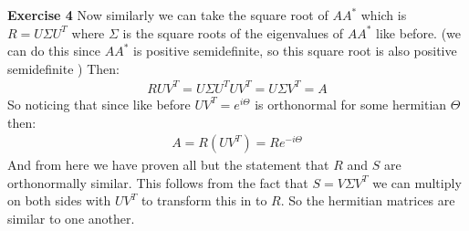 \documentclass[12pt]{article}
\newenvironment{exercise}[1]{\vspace{.1in}\noindent\textbf{Exercise #1 \hspace{.05em}}}{}
\theoremstyle{definition}
\theoremstyle{remark}
\begin{document}
\begin{exercise}{4}
	Now similarly we can take the square root of $AA^*$ which is $R=U\Sigma U^T$ where $\Sigma$ is the square roots of the eigenvalues of $AA^*$ like before. (we can do this since $AA^*$ is positive semidefinite, so this square root is also positive semidefinite ) Then:
	\begin{align}
		RUV^T=U\Sigma U^TUV^T=U\Sigma V^T=A
	\end{align}
	So noticing that since like before $UV^T=e^{i\Theta}$ is orthonormal for  some hermitian $\Theta$ then:
	\begin{align}
		A=R(UV^T)=Re^{-i\Theta}
	\end{align}
	And from here we have proven all but the statement that $R$ and $S$ are orthonormally similar. This follows from the fact that $S=V\Sigma V^T$ we can multiply on both sides with $UV^T$ to transform this in to $R$. So the hermitian matrices are similar to one another.
\end{exercise}
\end{document}
